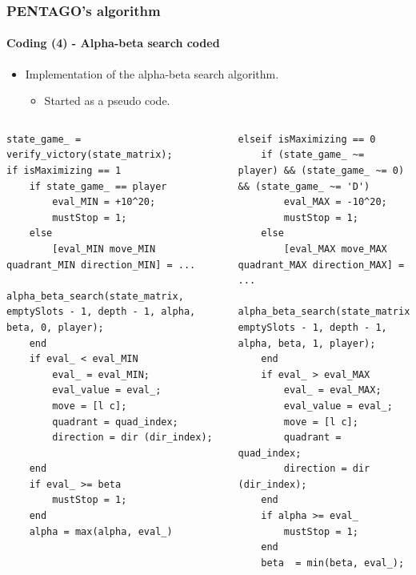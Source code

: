 \documentclass[10pt]{beamer}
\begin{document}
\begin{frame}[fragile]

\frametitle{PENTAGO's algorithm}
\framesubtitle{Coding (4) - Alpha-beta search coded}

\begin{itemize}
  	\item Implementation of the alpha-beta search algorithm.
	
	\begin{itemize}
	  
		\item Started as a pseudo code.

	\end{itemize}
 

\end{itemize}

\begin {columns}
\begin{lstlisting}[basicstyle=\tiny\ttfamily, numbers=none]
state_game_ = verify_victory(state_matrix);
if isMaximizing == 1
    if state_game_ == player
        eval_MIN = +10^20;
        mustStop = 1;
    else
        [eval_MIN move_MIN quadrant_MIN direction_MIN] = ...
            alpha_beta_search(state_matrix, emptySlots - 1, depth - 1, alpha, beta, 0, player);                        
    end
    if eval_ < eval_MIN
        eval_ = eval_MIN; 
        eval_value = eval_;
        move = [l c]; 
        quadrant = quad_index;
        direction = dir (dir_index);
        
    end
    if eval_ >= beta
        mustStop = 1;
    end
    alpha = max(alpha, eval_)
\end{lstlisting}
		
\begin{lstlisting}[basicstyle=\tiny\ttfamily, numbers=none]
elseif isMaximizing == 0
    if (state_game_ ~= player) && (state_game_ ~= 0) && (state_game_ ~= 'D')
        eval_MAX = -10^20;
        mustStop = 1;
    else
        [eval_MAX move_MAX quadrant_MAX direction_MAX] = ...
            alpha_beta_search(state_matrix, emptySlots - 1, depth - 1, alpha, beta, 1, player);
    end
    if eval_ > eval_MAX 
        eval_ = eval_MAX; 
        eval_value = eval_;
        move = [l c]; 
        quadrant = quad_index;
        direction = dir (dir_index);
  	end
    if alpha >= eval_
        mustStop = 1;
    end
    beta  = min(beta, eval_);
\end{lstlisting}

\end{columns}

\end{frame}
\end{document}
